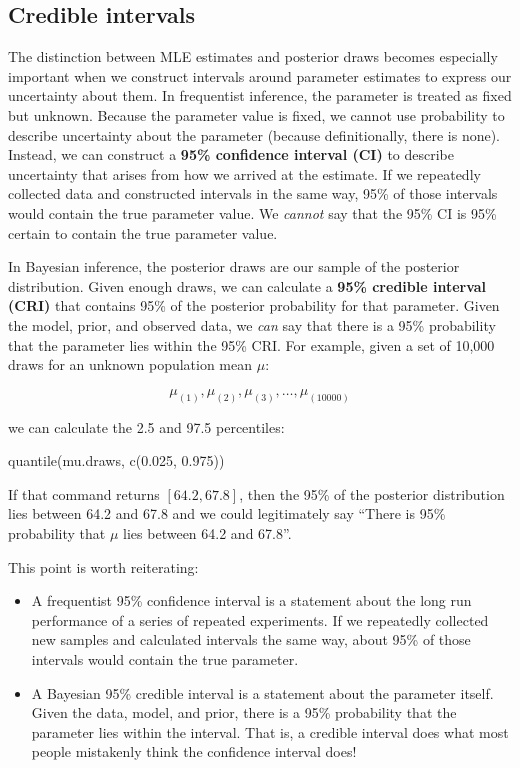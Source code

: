 \documentclass[
  13,
  letterpaper,
]{report}
\newenvironment{Shaded}{\begin{snugshade}}{\end{snugshade}}
\newcommand{\FloatTok}[1]{\textcolor[rgb]{0.68,0.00,0.00}{#1}}
\newcommand{\FunctionTok}[1]{\textcolor[rgb]{0.28,0.35,0.67}{#1}}
\newcommand{\NormalTok}[1]{\textcolor[rgb]{0.00,0.23,0.31}{#1}}
\newcounter{none} %
\providecommand{\tightlist}{%
  \setlength{\itemsep}{0pt}\setlength{\parskip}{0pt}}
\begin{document}
\subsection{Credible intervals}\label{sec-intro-bayes-cri}

The distinction between MLE estimates and posterior draws becomes
especially important when we construct intervals around parameter
estimates to express our uncertainty about them. In frequentist
inference, the parameter is treated as fixed but unknown. Because the
parameter value is fixed, we cannot use probability to describe
uncertainty about the parameter (because definitionally, there is none).
Instead, we can construct a \textbf{95\% confidence interval (CI)} to
describe uncertainty that arises from how we arrived at the estimate. If
we repeatedly collected data and constructed intervals in the same way,
95\% of those intervals would contain the true parameter value. We
\emph{cannot} say that the 95\% CI is 95\% certain to contain the true
parameter value.

In Bayesian inference, the posterior draws are our sample of the
posterior distribution. Given enough draws, we can calculate a
\textbf{95\% credible interval (CRI)} that contains 95\% of the
posterior probability for that parameter. Given the model, prior, and
observed data, we \emph{can} say that there is a 95\% probability that
the parameter lies within the 95\% CRI. For example, given a set of
10,000 draws for an unknown population mean \(\mu\):

\[\mu_{\left(1\right)},\mu_{\left(2\right)},\mu_{\left(3\right)},\ldots,\mu_{\left(10000\right)}\]

we can calculate the 2.5 and 97.5 percentiles:

\begin{Shaded}
\begin{Highlighting}[]
\FunctionTok{quantile}\NormalTok{(mu.draws, }\FunctionTok{c}\NormalTok{(}\FloatTok{0.025}\NormalTok{, }\FloatTok{0.975}\NormalTok{))}
\end{Highlighting}
\end{Shaded}

If that command returns \(\left[64.2, 67.8\right]\), then the 95\% of
the posterior distribution lies between 64.2 and 67.8 and we could
legitimately say ``There is 95\% probability that \(\mu\) lies between
64.2 and 67.8''.

This point is worth reiterating:

\begin{itemize}
\tightlist
\item
  A frequentist 95\% confidence interval is a statement about the long
  run performance of a series of repeated experiments. If we repeatedly
  collected new samples and calculated intervals the same way, about
  95\% of those intervals would contain the true parameter.
\item
  A Bayesian 95\% credible interval is a statement about the parameter
  itself. Given the data, model, and prior, there is a 95\% probability
  that the parameter lies within the interval. That is, a credible
  interval does what most people mistakenly think the confidence
  interval does!
\end{itemize}
\end{document}
